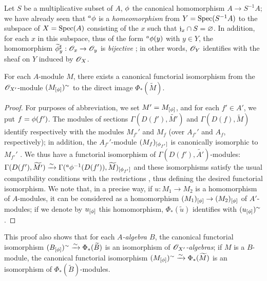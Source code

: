 \begin{exm}[1.6.2]
\label{1.1.6.2}
Let $S$ be a multiplicative subset of $A$, $\phi$ the canonical homomorphism $A\to S^{-1}A$;
we have already seen  that ${}^a\phi$ is a {\em homeomorphism} from
$Y={\mathop{\mathrm{Spec}}\nolimits}(S^{-1}A)$ to the subspace of $X={\mathop{\mathrm{Spec}}\nolimits}(A)$ consisting of the $x$ such that
$\mathfrak{j}_x\cap S=\varnothing$. In addition, for each $x$ in this subspace, thus of the form
${}^a\phi(y)$ with $y\in Y$, the homomorphism $\widetilde{\phi}_y^\sharp:\mathscr{O}_x\to\mathscr{O}_y$ is
{\em bijective} ; in other words, $\mathscr{O}_Y$ identifies with the sheaf on $Y$
induced by $\mathscr{O}_X$.
\end{exm}

\begin{prop}[1.6.3]
\label{1.1.6.3}
For each $A$-module $M$, there exists a canonical functorial isomorphism from the
$\mathscr{O}_{X'}$-module $(M_{[\phi]})^\sim$ to the direct image $\Phi_*(\widetilde{M})$.
\end{prop}

\begin{proof}
\label{proof-1.1.6.3}
For purposes of abbreviation, we set $M'=M_{[\phi]}$, and for each $f'\in A'$, we put
$f=\phi(f')$. The modules of sections $\Gamma(D(f'),\widetilde{M'})$ and
$\Gamma(D(f),\widetilde{M})$ identify respectively with the modules $M_{f'}'$ and $M_f$
(over $A_{f'}'$ and $A_f$, respectively); in addition, the $A_{f'}'$-module
$(M_f)_{[\phi_{f'}]}$ is canonically isomorphic to $M_{f'}'$ . We thus have
a functorial isomorphism of $\Gamma(D(f'),\widetilde{A'})$-modules:
$\Gamma(D(f'),\widetilde{M'})
\xrightarrow{\sim}\Gamma({}^a\phi^{-1}(D(f')),\widetilde{M})_{[\phi_{f'}]}$
and these isomorphisms satisfy the usual compatibility conditions with the restrictions
, thus defining the desired functorial isomorphism. We note that, in a
precise way, if $u:M_1\to M_2$ is a homomorphism of $A$-modules, it can be considered as a
homomorphism $(M_1)_{[\phi]}\to(M_2)_{[\phi]}$ of $A'$-modules; if we denote by
$u_{[\phi]}$ this homomorphism, $\Phi_*(\widetilde{u})$ identifies with
$(u_{[\phi]})^\sim$.
\end{proof}

This proof also shows that for each {\em $A$-algebra $B$}, the canonical functorial
isomorphism
$(B_{[\phi]})^\sim\xrightarrow{\sim}\Phi_*(\widetilde{B})$ is an isomorphism of
{\em $\mathscr{O}_{X'}$-algebras}; if $M$ is a $B$-module, the canonical functorial isomorphism
$(M_{[\phi]})^\sim\xrightarrow{\sim}\Phi_*(\widetilde{M})$ is an isomorphism of
$\Phi_*(\widetilde{B})$-modules.

